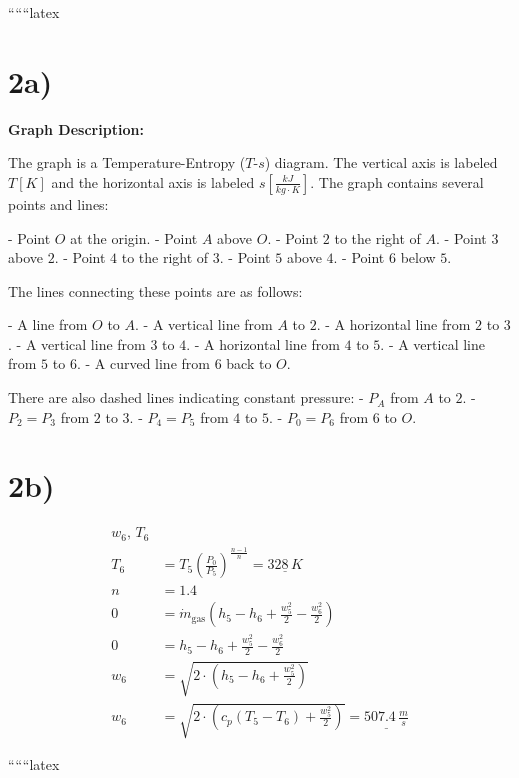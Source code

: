 
``````latex


\section*{2a)}

\begin{center}
\textbf{Graph Description:}
\end{center}

The graph is a Temperature-Entropy ($T$-$s$) diagram. The vertical axis is labeled $T [K]$ and the horizontal axis is labeled $s \left[ \frac{kJ}{kg \cdot K} \right]$. The graph contains several points and lines:

- Point $O$ at the origin.
- Point $A$ above $O$.
- Point $2$ to the right of $A$.
- Point $3$ above $2$.
- Point $4$ to the right of $3$.
- Point $5$ above $4$.
- Point $6$ below $5$.

The lines connecting these points are as follows:

- A line from $O$ to $A$.
- A vertical line from $A$ to $2$.
- A horizontal line from $2$ to $3$.
- A vertical line from $3$ to $4$.
- A horizontal line from $4$ to $5$.
- A vertical line from $5$ to $6$.
- A curved line from $6$ back to $O$.

There are also dashed lines indicating constant pressure:
- $P_A$ from $A$ to $2$.
- $P_2 = P_3$ from $2$ to $3$.
- $P_4 = P_5$ from $4$ to $5$.
- $P_0 = P_6$ from $6$ to $O$.

\section*{2b)}

\begin{align*}
w_6, \, T_6 \\
T_6 &= T_5 \left( \frac{P_0}{P_5} \right)^{\frac{n-1}{n}} = \underline{328 \, K} \\
n &= 1.4 \\
0 &= \dot{m}_{\text{gas}} \left( h_5 - h_6 + \frac{w_5^2}{2} - \frac{w_6^2}{2} \right) \\
0 &= h_5 - h_6 + \frac{w_5^2}{2} - \frac{w_6^2}{2} \\
w_6 &= \sqrt{2 \cdot \left( h_5 - h_6 + \frac{w_5^2}{2} \right)} \\
w_6 &= \sqrt{2 \cdot \left( c_p (T_5 - T_6) + \frac{w_5^2}{2} \right)} = \underline{507.4 \, \frac{m}{s}}
\end{align*}

``````latex

